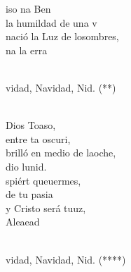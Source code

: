 \documentclass[12pt]{article}
\begin{document}
\begin{multicols*}{2}
\begin{cancion}
	iso na Ben  \\
	la humildad de una v\\
	nació la Luz de losombres, \\
	na    la erra \\\jump\\
	\begin{chorus}%
	vidad, Navidad, Nid. (**)\\
	\end{chorus}%
	\jump\\
	 Dios Toaso, \\
	entre ta oscuri,\\
	brilló en medio de laoche,\\
	dio  lunid.\\
	spiért queuermes, \\
	 de tu pasia\\
	y Cristo será tuuz, \\
	Aleaead\\\jump\\
	\begin{chorus}%
	vidad, Navidad, Nid. (****)\\
	\end{chorus}%
	\jump\\
\end{cancion}%


\end{multicols*}
\end{document}
